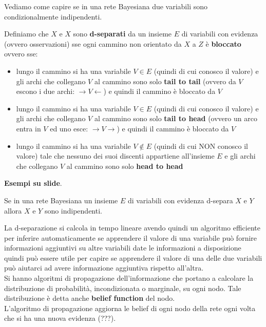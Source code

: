\documentclass[a4paper,12pt, oneside]{book}
\begin{document}
Vediamo come capire se in una rete Bayesiana due variabili sono condizionalmente
indipendenti.
\begin{definizione}
  Definiamo che $X$ e $X$ sono \textbf{d-separati} da un insieme $E$ di
  variabili con evidenza (ovvero osservazioni) sse ogni cammino non orientato da
  $X$ a $Z$ è \textbf{bloccato} ovvero sse:
  \begin{itemize}
    \item lungo il cammino si ha una variabile $V\in E$ (quindi di cui conosco
    il valore) e gli archi che
    collegano $V$ al cammino sono solo \textbf{tail to tail} (ovvero da $V$
    escono i 
    due archi: $\to V\gets$) e quindi il cammino è bloccato da $V$
    \item lungo il cammino si ha una variabile $V\in E$ (quindi di cui conosco
    il valore) e gli archi che
    collegano $V$ al cammino sono solo \textbf{tail to head} (ovvero un arco
    entra in 
    $V$ ed uno esce: $\to V\to$) e quindi il cammino è bloccato da $V$
    \item lungo il cammino si ha una variabile $V\not\in E$ (quindi di cui NON
    conosco il valore) tale che nessuno dei
    suoi discenti appartiene all'insieme $E$ e gli archi che
    collegano $V$ al cammino sono solo \textbf{head to head}
  \end{itemize}
\end{definizione}
\textbf{Esempi su slide}.\\
\begin{teorema}
  Se in una rete Bayesiana un insieme $E$ di variabili con evidenza d-separa $X$
  e $Y$ allora $X$ e $Y$ sono indipendenti.
\end{teorema}
La d-separazione si calcola in tempo lineare avendo quindi un algoritmo
efficiente per inferire automaticamente se apprendere il valore di una variabile
può fornire informazioni aggiuntivi su altre variabili date le informazioni a
disposizione quindi può essere utile per capire se apprendere il valore di una
delle due variabili può aiutarci ad avere informazione aggiuntiva rispetto
all’altra.\\ 
Si hanno algoritmi di propagazione dell'informazione che portano a calcolare la
distribuzione di probabilità, incondizionata o marginale, su ogni nodo. Tale
distribuzione è detta anche \textbf{belief function} del nodo. \\
L'algoritmo di propagazione aggiorna le belief di ogni nodo della rete ogni
volta che si ha una nuova evidenza (???).\\
\end{document}
